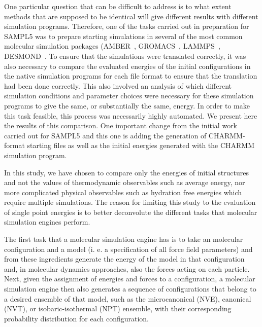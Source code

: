 One particular question that can be difficult to address is to what
extent methods that are supposed to be identical will give different
results with different simulation programs.  Therefore, one of the
tasks carried out in preparation for SAMPL5 was to prepare starting
simulations in several of the most common molecular simulation
packages (AMBER~\citep{???}, GROMACS~\citep{hess_gromacs_2008},
LAMMPS~\citep{plimpton_fast_1995},
DESMOND~\citep{bowers_scalable_2006}. To ensure that the simulations
were translated correctly, it was also necessary to compare the
evaluated energies of the initial configurations in the native
simulation programs for each file format to ensure that the
translation had been done correctly.  This also involved an analysis
of which different simulation conditions and parameter choices were
necessary for these simulation programs to give the same, or
substantially the same, energy.  In order to make this task feasible,
this process was necessarily highly automated. We present here the
results of this comparison. One important change from the initial work
carried out for SAMPL5 and this one is adding the generation of
CHARMM-format starting files as well as the initial energies generated
with the CHARMM simulation program.

In this study, we have chosen to compare only the energies of initial
structures and not the values of thermodynamic observables such as
average energy, nor more complicated physical observables such as
hydration free energies which require multiple simulations.  The
reason for limiting this study to the evaluation of single point
energies is to better deconvolute the different tasks that molecular
simulation engines perform.

The first task that a molecular simulation engine has is to take an
molecular configuration and a model (i. e. a specification of all
force field parameters) and from these ingredients generate the energy
of the model in that configuration and, in molecular dynamics
approaches, also the forces acting on each particle.  Next, given the
assignment of energies and forces to a configuration, a molecular
simulation engine then also generates a sequence of configurations
that belong to a desired ensemble of that model, such as the
microcanonical (NVE), canonical (NVT), or isobaric-isothermal (NPT)
ensemble, with their corresponding probability distribution for each
configuration.

